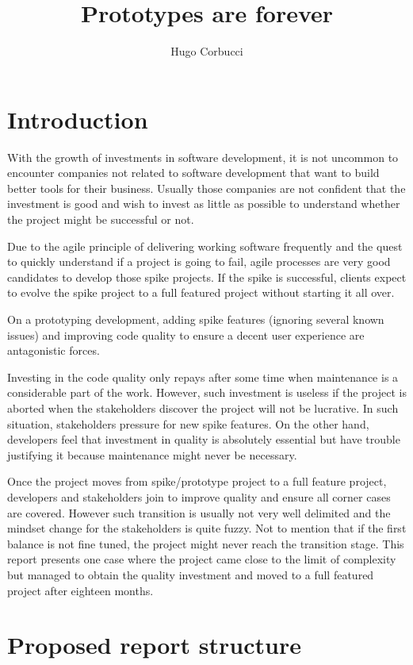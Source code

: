 \documentclass[a4paper,12pt,english]{article}
\title{Prototypes are forever}
\author{Hugo Corbucci}
\date{}
\begin{document}
\maketitle

\section{Introduction}
With the growth of investments in software development, it is not
uncommon to encounter companies not related to software development
that want to build better tools for their business. Usually those
companies are not confident that the investment is good and wish to
invest as little as possible to understand whether the project might
be successful or not.

Due to the agile principle of delivering working software frequently
and the quest to quickly understand if a project is going to fail,
agile processes are very good candidates to develop those spike
projects. If the spike is successful, clients expect to evolve the
spike project to a full featured project without starting it all over.

On a prototyping development, adding spike features (ignoring several
known issues) and improving code quality to ensure a decent user
experience are antagonistic forces.

Investing in the code quality only repays after some time when
maintenance is a considerable part of the work. However, such
investment is useless if the project is aborted when the stakeholders
discover the project will not be lucrative. In such situation,
stakeholders pressure for new spike features. On the other hand,
developers feel that investment in quality is absolutely essential but
have trouble justifying it because maintenance might never be
necessary.

Once the project moves from spike/prototype project to a full feature
project, developers and stakeholders join to improve quality and
ensure all corner cases are covered. However such transition is
usually not very well delimited and the mindset change for the
stakeholders is quite fuzzy. Not to mention that if the first balance
is not fine tuned, the project might never reach the transition
stage. This report presents one case where the project came close to
the limit of complexity but managed to obtain the quality investment
and moved to a full featured project after eighteen months.

\section{Proposed report structure}
\end{document}
